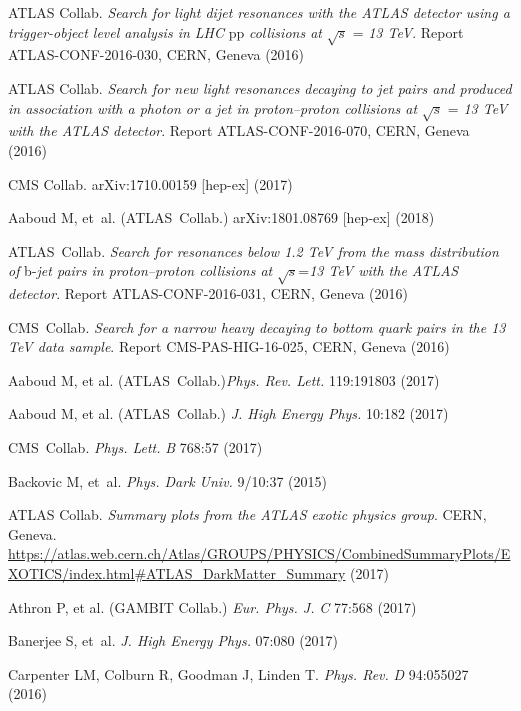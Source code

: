\documentclass{ar-1col}
\begin{document}
\begin{thebibliography}{175}
{ATLAS Collab}. \textit{Search for light dijet resonances with the ATLAS detector using a
trigger-object level analysis in LHC }pp \textit{collisions at} $\sqrt{s}$ = \textit{13 TeV}. Report ATLAS-CONF-2016-030, CERN, Geneva (2016)

{ATLAS Collab}. \textit{Search for new light resonances decaying to jet pairs and produced in association with a photon or a jet in proton--proton collisions at}
$\sqrt{s}$ = \textit{13 TeV with the ATLAS detector}. Report ATLAS-CONF-2016-070, CERN, Geneva (2016)

{CMS Collab}. arXiv:1710.00159 [hep-ex] (2017)

Aaboud M, et~al. (ATLAS\ Collab.) arXiv:1801.08769 [hep-ex] (2018)

{ATLAS~Collab}. \textit{Search for resonances below 1.2 TeV from the mass distribution of }b-\textit{jet pairs in proton--proton collisions at} $\sqrt{s}$=\textit{13 TeV with the ATLAS detector}. Report ATLAS-CONF-2016-031, CERN, Geneva (2016)

{CMS~Collab}. \textit{Search for a narrow heavy decaying to bottom quark pairs in the 13 TeV data sample}.
Report {CMS-PAS-HIG-16-025}, CERN, Geneva (2016)

Aaboud M, et al. (ATLAS~Collab.)\textit{Phys. Rev. Lett.} 119:191803 (2017)

{Aaboud M, et al. (ATLAS~Collab.)} \textit{J. High Energy Phys.} 10:182 (2017)

{CMS~Collab}. \textit{Phys. Lett.} \textit{B} 768:57 (2017)

Backovic M, et~al. \textit{Phys. Dark Univ.} 9/10:37 (2015)

{ATLAS Collab}. {\textit{Summary plots from the ATLAS exotic
physics group}}. CERN, Geneva. \url{https://atlas.web.cern.ch/Atlas/GROUPS/PHYSICS/CombinedSummaryPlots/EXOTICS/index.html#ATLAS_DarkMatter_Summary} (2017)


{Athron P, et al. (GAMBIT Collab}.) \textit{Eur. Phys. J.} \textit{C} 77:568 (2017)

Banerjee S, et~al. \textit{J. High Energy Phys.} 07:080 (2017)

Carpenter LM, Colburn R, Goodman J, Linden T. \textit{Phys. Rev.}
\textit{D} 94:055027 (2016)


\end{thebibliography}
\end{document}

